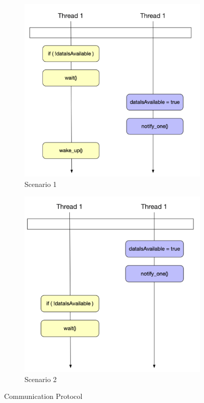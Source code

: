 \documentclass[11pt, a4paper]{article}
\begin{document}
\begin{figure}[htpb!]
\begin{subfigure}{.5\textwidth}
  \centering
  \includegraphics[width=.9\linewidth]{scenario_1}  
  \caption{Scenario 1}
	\label{fig:scenario_1}
\end{subfigure}
\begin{subfigure}{.5\textwidth}
  \centering
  \includegraphics[width=.9\linewidth]{scenario_2}  
  \caption{Scenario 2}
	\label{fig:scenario_2}
\end{subfigure}
\caption{Communication Protocol}
\label{fig:communication_protocol}
\end{figure}
\end{document}
